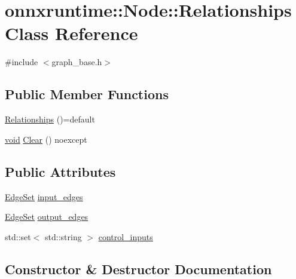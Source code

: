 \hypertarget{classonnxruntime_1_1Node_1_1Relationships}{}\section{onnxruntime\+:\+:Node\+:\+:Relationships Class Reference}
\label{classonnxruntime_1_1Node_1_1Relationships}


{\ttfamily \#include $<$graph\+\_\+base.\+h$>$}

\subsection*{Public Member Functions}
\begin{DoxyCompactItemize}
\item 
\mbox{\hyperlink{classonnxruntime_1_1Node_1_1Relationships_a127be100aab3c8b81846b9bfedbe3c78}{Relationships}} ()=default
\item 
\mbox{\hyperlink{mlasi_8h_a88f941d423cb2a819b70a1358982b1a6}{void}} \mbox{\hyperlink{classonnxruntime_1_1Node_1_1Relationships_a1ddb7b4776d60a3e4423cc02a4112069}{Clear}} () noexcept
\end{DoxyCompactItemize}
\subsection*{Public Attributes}
\begin{DoxyCompactItemize}
\item 
\mbox{\hyperlink{classonnxruntime_1_1Node_a21f67a4ba50eb4c6dea0c37982b48da8}{Edge\+Set}} \mbox{\hyperlink{classonnxruntime_1_1Node_1_1Relationships_af2b0f5c2d3c071d99cd5120a717699b8}{input\+\_\+edges}}
\item 
\mbox{\hyperlink{classonnxruntime_1_1Node_a21f67a4ba50eb4c6dea0c37982b48da8}{Edge\+Set}} \mbox{\hyperlink{classonnxruntime_1_1Node_1_1Relationships_afc504014c91de4ad25fecdd21c1d6a47}{output\+\_\+edges}}
\item 
std\+::set$<$ std\+::string $>$ \mbox{\hyperlink{classonnxruntime_1_1Node_1_1Relationships_a6c7d0231d65aa04f2f5e3ef85680792c}{control\+\_\+inputs}}
\end{DoxyCompactItemize}


\subsection{Constructor \& Destructor Documentation}
\mbox{\label{classonnxruntime_1_1Node_1_1Relationships_a127be100aab3c8b81846b9bfedbe3c78}} 
